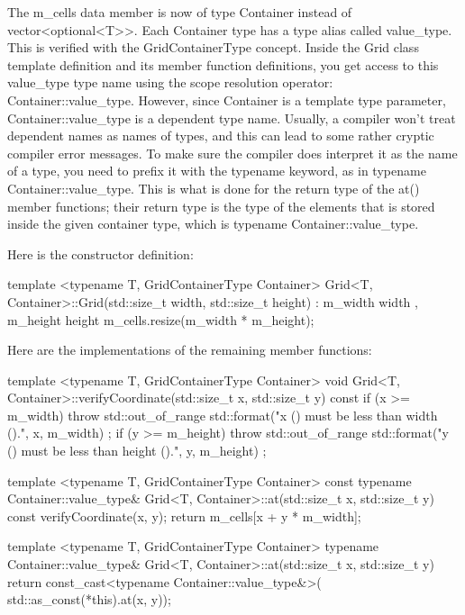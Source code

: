 The m\_cells data member is now of type Container instead of vector<optional<T>{}>. Each Container type has a type alias called value\_type. This is verified with the GridContainerType concept. Inside the Grid class template definition and its member function definitions, you get access to this value\_type type name using the scope resolution operator: Container::value\_type. However, since Container is a template type parameter, Container::value\_type is a dependent type name. Usually, a compiler won’t treat dependent names as names of types, and this can lead to some rather cryptic compiler error messages. To make sure the compiler does interpret it as the name of a type, you need to prefix it with the typename keyword, as in typename Container::value\_type. This is what is done for the return type of the at() member functions; their return type is the type of the elements that is stored inside the given container type, which is typename Container::value\_type.

Here is the constructor definition:

\begin{cpp}
template <typename T, GridContainerType Container>
Grid<T, Container>::Grid(std::size_t width, std::size_t height)
    : m_width { width }, m_height { height }
{
    m_cells.resize(m_width * m_height);
}
\end{cpp}

Here are the implementations of the remaining member functions:

\begin{cpp}
template <typename T, GridContainerType Container>
void Grid<T, Container>::verifyCoordinate(std::size_t x, std::size_t y) const
{
    if (x >= m_width) {
        throw std::out_of_range {
            std::format("x ({}) must be less than width ({}).", x, m_width) };
    }
    if (y >= m_height) {
        throw std::out_of_range {
            std::format("y ({}) must be less than height ({}).", y, m_height) };
    }
}

template <typename T, GridContainerType Container>
const typename Container::value_type&
    Grid<T, Container>::at(std::size_t x, std::size_t y) const
{
    verifyCoordinate(x, y);
    return m_cells[x + y * m_width];
}

template <typename T, GridContainerType Container>
typename Container::value_type&
    Grid<T, Container>::at(std::size_t x, std::size_t y)
{
    return const_cast<typename Container::value_type&>(
        std::as_const(*this).at(x, y));
}
\end{cpp}

